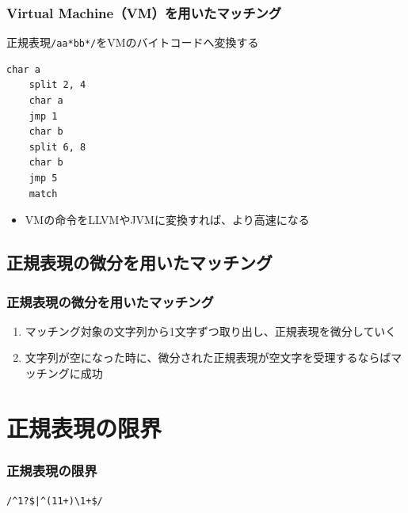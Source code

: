 \documentclass[12pt, unicode, svgnames, handout]{beamer}
\begin{document}
\begin{frame}[fragile]
  \frametitle{Virtual Machine（VM）を用いたマッチング}

  正規表現\lstinline|/aa*bb*/|をVMのバイトコードへ変換する
  
  \begin{exampleblock}{}
    \begin{center}
\begin{lstlisting}[style=vm]
    char a
    split 2, 4
    char a
    jmp 1
    char b
    split 6, 8
    char b
    jmp 5
    match
\end{lstlisting}
    \end{center}
  \end{exampleblock}

  \begin{itemize}
    \item<2-> VMの命令をLLVMやJVMに変換すれば、より高速になる
  \end{itemize}
\end{frame}

\subsection{正規表現の微分を用いたマッチング}
\begin{frame}
  \frametitle{正規表現の微分を用いたマッチング}

  
  \begin{enumerate}
    \item<3-> マッチング対象の文字列から1文字ずつ取り出し、正規表現を微分していく
    \item<4-> 文字列が空になった時に、微分された正規表現が空文字を受理するならばマッチングに成功
  \end{enumerate}
\end{frame}

\section{正規表現の限界}
\begin{frame}[fragile]
  \frametitle{正規表現の限界}

  \begin{block}{}
    \centering
    \LARGE
    \lstinline{/^1?$|^(11+)\1+$/}
  \end{block}
\end{frame}
\end{document}
